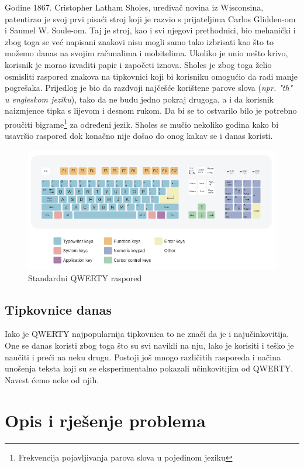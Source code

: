\documentclass[times, utf8, zavrsni]{fer}
\begin{document}
Godine 1867. Cristopher Latham Sholes, uređivač novina iz Wisconsina, patentirao je svoj prvi pisaći stroj koji je razvio s prijateljima Carlos Glidden-om i Saumel W. Soule-om. Taj je stroj, kao i svi njegovi prethodnici, bio mehanički i zbog toga se već napisani znakovi nisu mogli samo tako izbrisati kao što to možemo danas na svojim računalima i mobitelima. Ukoliko je unio nešto krivo, korisnik je morao izvaditi papir i započeti iznova. Sholes je zbog toga želio osmisliti raspored znakova na tipkovnici koji bi korisniku omogućio da radi manje pogrešaka. Prijedlog je bio da razdvoji najčešće korištene parove slova (\emph{npr. "th" u engleskom jeziku}), tako da ne budu jedno pokraj drugoga, a i da korisnik naizmjence tipka s lijevom i desnom rukom. Da bi se to ostvarilo bilo je potrebno proučiti bigrame\footnote{Frekvencija pojavljivanja parova slova u pojedinom jeziku} za određeni jezik. Sholes se mučio nekoliko godina kako bi usavršio raspored dok konačno nije došao do onog kakav se i danas koristi.

\begin{figure}[htb]
\centering
\includegraphics[width=12cm]{img/qwerty.png}
\caption{Standardni QWERTY raspored}
\label{fig:qwerty}
\end{figure}

\section{Tipkovnice danas}
Iako je QWERTY najpopularnija tipkovnica to ne znači da je i najučinkovitija. One se danas koristi zbog toga što su svi navikli na nju, lako je korisiti i teško je naučiti i preći na neku drugu. Postoji još mnogo različitih rasporeda i načina unošenja teksta koji su se eksperimentalno pokazali učinkovitijim od QWERTY. Navest ćemo neke od njih.


\chapter{Opis i rješenje problema}
\end{document}
